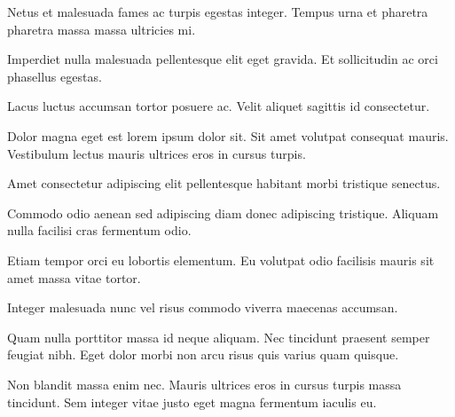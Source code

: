 \begin{PosterColumn}{0.23}

\begin{TextBox}
 \vspace*{0.9cm}
 
 \sf \LARGE
 
 \begin{description}
\item Netus et malesuada fames ac turpis egestas integer. Tempus urna et pharetra pharetra massa massa ultricies mi. 
\item Imperdiet nulla malesuada pellentesque elit eget gravida. Et sollicitudin ac orci phasellus egestas. 
\item Lacus luctus accumsan tortor posuere ac. Velit aliquet sagittis id consectetur. 
\item Dolor magna eget est lorem ipsum dolor sit. Sit amet volutpat consequat mauris. Vestibulum lectus mauris ultrices eros in cursus turpis. 
\item Amet consectetur adipiscing elit pellentesque habitant morbi tristique senectus. 
\item Commodo odio aenean sed adipiscing diam donec adipiscing tristique. Aliquam nulla facilisi cras fermentum odio. 
\item Etiam tempor orci eu lobortis elementum. Eu volutpat odio facilisis mauris sit amet massa vitae tortor. 
\item Integer malesuada nunc vel risus commodo viverra maecenas accumsan.
\item Quam nulla porttitor massa id neque aliquam. Nec tincidunt praesent semper feugiat nibh. Eget dolor morbi non arcu risus quis varius quam quisque. 
\item Non blandit massa enim nec. Mauris ultrices eros in cursus turpis massa tincidunt. Sem integer vitae justo eget magna fermentum iaculis eu. 
\end{description}
 
\end{TextBox}



\end{PosterColumn}
